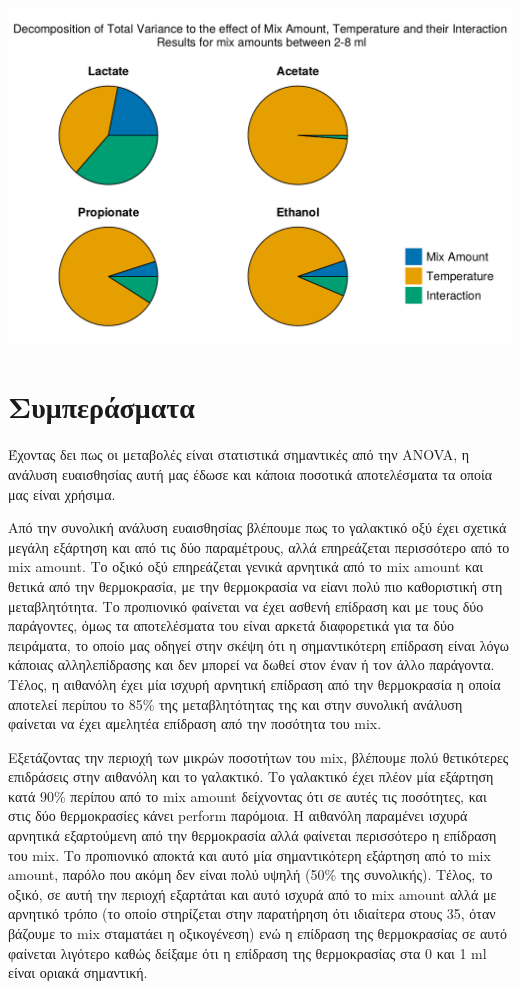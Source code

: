 \documentclass[11pt]{article}
\begin{document}
\begin{center}
\includegraphics[width=.9\linewidth]{../plots/sensitivity/high_sobol.png}
\end{center}

\section{Συμπεράσματα}
\label{sec:orgf2a9105}
Έχοντας δει πως οι μεταβολές είναι στατιστικά σημαντικές από την ANOVA, η ανάλυση ευαισθησίας αυτή μας έδωσε και κάποια ποσοτικά αποτελέσματα τα οποία μας είναι χρήσιμα.

Από την συνολική ανάλυση ευαισθησίας βλέπουμε πως το γαλακτικό οξύ έχει σχετικά μεγάλη εξάρτηση και από τις δύο παραμέτρους, αλλά επηρεάζεται περισσότερο από το mix amount. Το οξικό οξύ επηρεάζεται γενικά αρνητικά από το mix amount και θετικά από την θερμοκρασία, με την θερμοκρασία να είανι πολύ πιο καθοριστική στη μεταβλητότητα. Το προπιονικό φαίνεται να έχει ασθενή επίδραση και με τους δύο παράγοντες, όμως τα αποτελέσματα του είναι αρκετά διαφορετικά για τα δύο πειράματα, το οποίο μας οδηγεί στην σκέψη ότι η σημαντικότερη επίδραση είναι λόγω κάποιας αλληλεπίδρασης και δεν μπορεί να δωθεί στον έναν ή τον άλλο παράγοντα. Τέλος, η αιθανόλη έχει μία ισχυρή αρνητική επίδραση από την θερμοκρασία η οποία αποτελεί περίπου το 85\% της μεταβλητότητας της και στην συνολική ανάλυση φαίνεται να έχει αμελητέα επίδραση από την ποσότητα του mix.

Εξετάζοντας την περιοχή των μικρών ποσοτήτων του mix, βλέπουμε πολύ θετικότερες επιδράσεις στην αιθανόλη και το γαλακτικό. Το γαλακτικό έχει πλέον μία εξάρτηση κατά 90\% περίπου από το mix amount δείχνοντας ότι σε αυτές τις ποσότητες, και στις δύο θερμοκρασίες κάνει perform παρόμοια. Η αιθανόλη παραμένει ισχυρά αρνητικά εξαρτούμενη από την θερμοκρασία αλλά φαίνεται περισσότερο η επίδραση του mix. Το προπιονικό αποκτά και αυτό μία σημαντικότερη εξάρτηση από το mix amount, παρόλο που ακόμη δεν είναι πολύ υψηλή (50\% της συνολικής). Τέλος, το οξικό, σε αυτή την περιοχή εξαρτάται και αυτό ισχυρά από το mix amount αλλά με αρνητικό τρόπο (το οποίο στηρίζεται στην παρατήρηση ότι ιδιαίτερα στους 35, όταν βάζουμε το mix σταματάει η οξικογένεση) ενώ η επίδραση της θερμοκρασίας σε αυτό φαίνεται λιγότερο καθώς δείξαμε ότι η επίδραση της θερμοκρασίας στα 0 και 1 ml είναι οριακά σημαντική.
\end{document}
